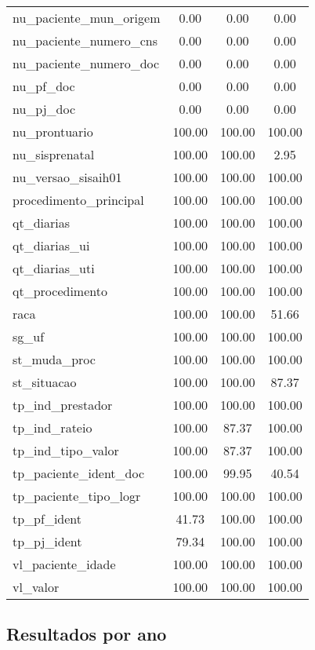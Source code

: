 \documentclass[
  12,
  table]{proadi}
\begin{document}
\begin{longtable}{lccc}
nu\_paciente\_mun\_origem & 0.00 & 0.00 & 0.00\\
\addlinespace
nu\_paciente\_numero\_cns & 0.00 & 0.00 & 0.00\\
nu\_paciente\_numero\_doc & 0.00 & 0.00 & 0.00\\
nu\_pf\_doc & 0.00 & 0.00 & 0.00\\
nu\_pj\_doc & 0.00 & 0.00 & 0.00\\
nu\_prontuario & 100.00 & 100.00 & 100.00\\
\addlinespace
nu\_sisprenatal & 100.00 & 100.00 & 2.95\\
nu\_versao\_sisaih01 & 100.00 & 100.00 & 100.00\\
procedimento\_principal & 100.00 & 100.00 & 100.00\\
qt\_diarias & 100.00 & 100.00 & 100.00\\
qt\_diarias\_ui & 100.00 & 100.00 & 100.00\\
\addlinespace
qt\_diarias\_uti & 100.00 & 100.00 & 100.00\\
qt\_procedimento & 100.00 & 100.00 & 100.00\\
raca & 100.00 & 100.00 & 51.66\\
sg\_uf & 100.00 & 100.00 & 100.00\\
st\_muda\_proc & 100.00 & 100.00 & 100.00\\
\addlinespace
st\_situacao & 100.00 & 100.00 & 87.37\\
tp\_ind\_prestador & 100.00 & 100.00 & 100.00\\
tp\_ind\_rateio & 100.00 & 87.37 & 100.00\\
tp\_ind\_tipo\_valor & 100.00 & 87.37 & 100.00\\
tp\_paciente\_ident\_doc & 100.00 & 99.95 & 40.54\\
\addlinespace
tp\_paciente\_tipo\_logr & 100.00 & 100.00 & 100.00\\
tp\_pf\_ident & 41.73 & 100.00 & 100.00\\
tp\_pj\_ident & 79.34 & 100.00 & 100.00\\
vl\_paciente\_idade & 100.00 & 100.00 & 100.00\\
vl\_valor & 100.00 & 100.00 & 100.00\\*
\end{longtable}
\endgroup{}

\hypertarget{resultados-por-ano}{%
\subsection*{Resultados por ano}\label{resultados-por-ano}}
\end{document}
